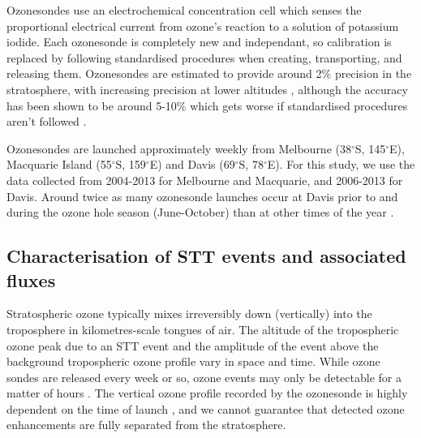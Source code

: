 \documentclass{article}
\begin{document}
    Ozonesondes use an electrochemical concentration cell which senses the proportional electrical current from ozone's reaction to a solution of potassium iodide.
    Each ozonesonde is completely new and independant, so calibration is replaced by following standardised procedures when creating, transporting, and releasing them.
    Ozonesondes are estimated to provide around 2\% precision in the stratosphere, with increasing precision at lower altitudes \citep{noaasondes}, although the accuracy has been shown to be around 5-10\% which gets worse if standardised procedures aren't followed \citep{Smit2007}.
    
    Ozonesondes are launched approximately weekly from Melbourne (38$^{\circ}$S, 145$^{\circ}$E), Macquarie Island (55$^{\circ}$S, 159$^{\circ}$E) and Davis (69$^{\circ}$S, 78$^{\circ}$E). 
    For this study, we use the data collected from 2004-2013 for Melbourne and Macquarie, and 2006-2013 for Davis. 
    Around twice as many ozonesonde launches occur at Davis prior to and during the ozone hole season (June-October) than at other times of the year \citep{Alexander2013}.
    

  \subsection{Characterisation of STT events and associated fluxes}
    \label{Section:CharacterisationOfSTTs}
    
    Stratospheric ozone typically mixes irreversibly down (vertically) into the troposphere in kilometres-scale tongues of air.
    The altitude of the tropospheric ozone peak due to an STT event and the amplitude of the event above the background tropospheric ozone profile vary in space and time.
    While ozone sondes are released every week or so, ozone events may only be detectable for a matter of hours \citep{Tang2012}.
    The vertical ozone profile recorded by the ozonesonde is highly dependent on the time of launch \citep{Sprenger2003}, and we cannot guarantee that detected ozone enhancements are fully separated from the stratosphere.
    
\end{document}
